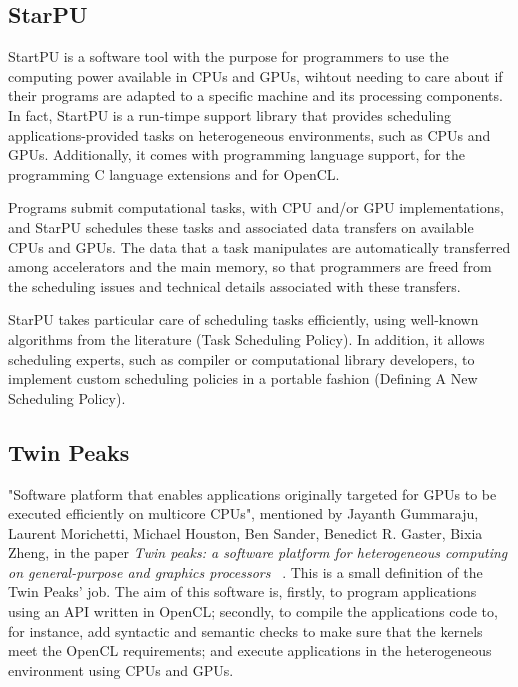 \subsection{StarPU}
StartPU is a software tool with the purpose for programmers to use the computing power available in CPUs and GPUs, wihtout needing to care about if their programs are adapted to a specific machine and its processing components.~\cite{StartPU}
In fact, StartPU is a run-timpe support library that provides scheduling applications-provided tasks on heterogeneous environments, such as CPUs and GPUs. Additionally, it comes with programming language support, for the programming C language extensions and for OpenCL.

Programs submit computational tasks, with CPU and/or GPU implementations, and StarPU schedules these tasks and associated data transfers on available CPUs and GPUs. The data that a task manipulates are automatically transferred among accelerators and the main memory, so that programmers are freed from the scheduling issues and technical details associated with these transfers.

StarPU takes particular care of scheduling tasks efficiently, using well-known algorithms from the literature (Task Scheduling Policy). In addition, it allows scheduling experts, such as compiler or computational library developers, to implement custom scheduling policies in a portable fashion (Defining A New Scheduling Policy).
\subsection{Twin Peaks}
"Software platform that enables applications originally targeted for GPUs to be executed efficiently on multicore CPUs", mentioned by Jayanth Gummaraju, Laurent Morichetti, Michael Houston, Ben Sander, Benedict R. Gaster, Bixia Zheng, in the paper \textit{Twin peaks: a software platform for heterogeneous computing on general-purpose and graphics processors} ~\cite{Gummaraju2010}. This is a small definition of the Twin Peaks' job. The aim of this software is, firstly, to program applications using an API written in OpenCL; secondly, to compile the applications code to, for instance, add syntactic and semantic checks to make sure that the kernels meet the OpenCL requirements; and execute applications in the heterogeneous environment using CPUs and GPUs.

